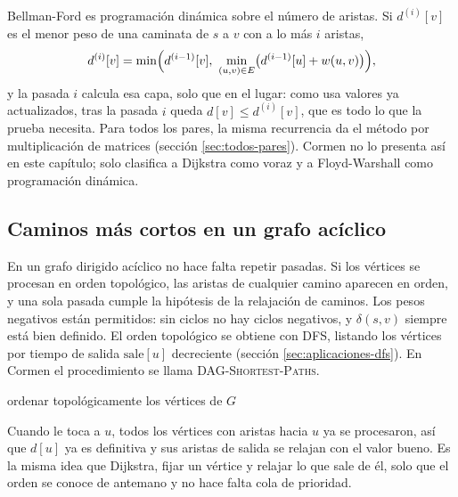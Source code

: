\documentclass[11pt,letterpaper]{article}
\begin{document}
\begin{observacion}
  Bellman-Ford es programación dinámica sobre el número de aristas.
  Si $d^{(i)}[v]$ es el menor peso de una caminata de $s$ a $v$ con a
  lo más $i$ aristas,
  \[
    d^{(i)}[v] = \min\Bigl(d^{(i-1)}[v],\
      \min_{(u, v) \in E} \bigl(d^{(i-1)}[u] + w(u, v)\bigr)\Bigr) ,
  \]
  y la pasada $i$ calcula esa capa, solo que en el lugar: como usa
  valores ya actualizados, tras la pasada $i$ queda
  $d[v] \le d^{(i)}[v]$, que es todo lo que la prueba necesita. Para
  todos los pares, la misma recurrencia da el método por
  multiplicación de matrices (sección \ref{sec:todos-pares}). Cormen
  no lo presenta así en este capítulo; solo clasifica a Dijkstra como
  voraz y a Floyd-Warshall como programación dinámica.
\end{observacion}


\subsection*{Caminos más cortos en un grafo acíclico}

En un grafo dirigido acíclico no hace falta repetir pasadas. Si los
vértices se procesan en orden topológico, las aristas de cualquier
camino aparecen en orden, y una sola pasada cumple la hipótesis de la
relajación de caminos. Los pesos negativos están permitidos: sin
ciclos no hay ciclos negativos, y $\delta(s, v)$ siempre está bien
definido. El orden topológico se obtiene con DFS, listando los
vértices por tiempo de salida $\text{sale}[u]$ decreciente (sección
\ref{sec:aplicaciones-dfs}). En Cormen el procedimiento se llama
\textsc{DAG-Shortest-Paths}.

\begin{algorithm}[H]
\caption{\textsc{Caminos-DAG}$(G, w, s)$}
\label{alg:caminos-dag}
\begin{algorithmic}[1]
  \State ordenar topológicamente los vértices de $G$
  \State {}
      \State {}
    \EndFor
  \EndFor
\EndProcedure
\end{algorithmic}
\end{algorithm}

Cuando le toca a $u$, todos los vértices con aristas hacia $u$ ya se
procesaron, así que $d[u]$ ya es definitiva y sus aristas de salida se
relajan con el valor bueno. Es la misma idea que Dijkstra, fijar un
vértice y relajar lo que sale de él, solo que el orden se conoce de
antemano y no hace falta cola de prioridad.
\end{document}
